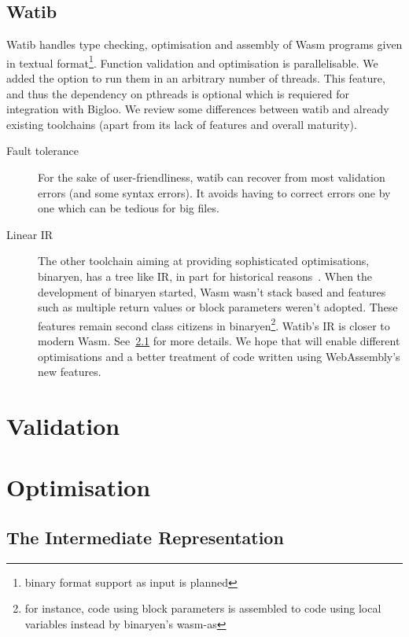 \documentclass[10pt]{article}
\begin{document}
\subsection{Watib}
Watib handles type checking, optimisation and assembly of Wasm programs given in
textual format\footnote{binary format support as input is planned}. Function
validation and optimisation is parallelisable. We added the option to run them
in an arbitrary number of threads. This feature, and thus the dependency on
pthreads is optional which is requiered for integration with Bigloo. We review
some differences between watib and already existing toolchains (apart from its
lack of features and overall maturity).
\begin{description}
\item[Fault tolerance] For the sake of user-friendliness, watib can recover from
  most validation errors (and some syntax errors). It avoids having to correct
  errors one by one which can be tedious for big files.
\item[Linear IR] The other toolchain aiming at providing sophisticated
  optimisations, binaryen, has a tree like IR, in part for historical
  reasons~\cite{BinaryenIR}. When the development of binaryen started, Wasm
  wasn't stack based and features such as multiple return values or block
  parameters weren't adopted. These features remain second class citizens in
  binaryen\footnote{for instance, code using block parameters is assembled to
  code using local variables instead by binaryen's \textsf{wasm-as}}. Watib's IR
  is closer to modern Wasm. See~\ref{ir} for more details. We hope that will
  enable different optimisations and a better treatment of code written using
  WebAssembly's new features.
\end{description}
\section{Validation}
\section{Optimisation}
\subsection{The Intermediate Representation}\label{ir}
\end{document}
